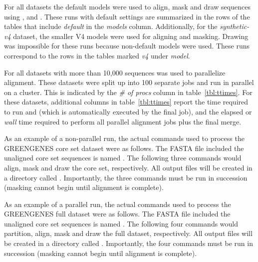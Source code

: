For all datasets the default models were used to align, mask and draw
sequences using ,  and
. These runs with default settings are summarized in the
rows of the tables that include \emph{default} in the \emph{models} column.
Additionally, for the \emph{synthetic-v4} dataset, the smaller V4
models were used for aligning and masking. Drawing was impossible for
these runs because non-default models were used. These runs correspond
to the rows in the tables marked \emph{v4} under \emph{model}.

For all datasets with more than 10,000 sequences  was
used to parallelize alignment. These datasets were split up into 100
separate jobs and run in parallel on a cluster. This is indicated by
the \emph{\# of procs} column in table~\ref{tbl:ttimes}.
For these datasets, additional columns in table~\ref{tbl:ttimes}
report the time required to run  and 
(which is automatically executed by the final  job),
and the elapsed or \emph{wall} time required to perform all parallel
alignment jobs plus the final merge.


As an example of a non-parallel run, the actual commands used to process the
GREENGENES core set dataset were as follows. The FASTA file
included the unaligned core set sequences is named . The
following three commands would align, mask and draw the core
set, respectively. All output files will be created in a directory called
. Importantly, the three commands  must be run in succession
(masking cannot begin until alignment is complete). 




As an example of a parallel run, the actual commands used to process the
GREENGENES full dataset were as follows. The FASTA file
included the unaligned core set sequences is named . The
following four commands would partition, align, mask and draw the full
dataset, respectively. All output files will be created in a directory
called . Importantly, the four commands must be run in succession
(masking cannot begin until alignment is complete). 

